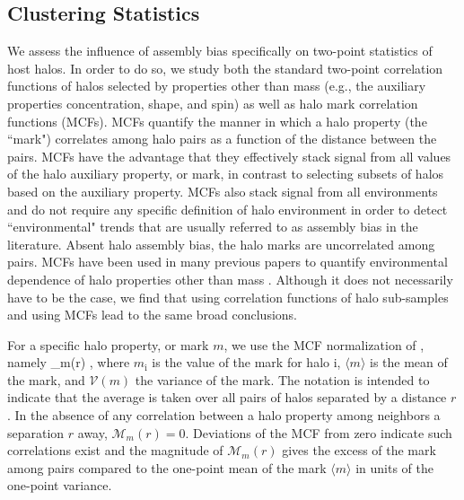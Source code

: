 \documentclass[usenatbib]{mnras}
\begin{document}
\subsection{Clustering Statistics}
\label{subsection:clusteringstatistics}


We assess the influence of assembly bias specifically on two-point statistics of host halos. In order to do so, we 
study both the standard two-point correlation functions of halos selected by properties other than mass 
(e.g., the auxiliary properties concentration, shape, and spin) as well as halo mark correlation functions
(MCFs). MCFs quantify the manner in which a halo property (the ``mark") correlates among halo pairs as a function
of the distance between the pairs. MCFs have the advantage that they effectively stack signal from all values of 
the halo auxiliary property, or mark, in contrast to selecting subsets of halos based on the auxiliary property. 
MCFs also stack signal from all environments and do not require any specific definition of halo environment in 
order to detect ``environmental" trends that are usually referred to as assembly bias in the literature. 
Absent halo assembly bias, the halo marks are uncorrelated among pairs. 
MCFs have been used in many previous papers to quantify environmental dependence of halo 
properties other than mass \citep{sheth_tormen04,sheth05, harker_etal06,wechsler_etal06,mao_etal15}. 
Although it does not necessarily have to be the case, we find that using correlation functions of halo sub-samples 
and using MCFs lead to the same broad conclusions. 


For a specific halo property, or mark $m$, we use the MCF normalization of \citet{wechsler_etal06}, namely 
%
\beq
{}_m(r) \equiv {},
\eeq
%
where $m_{\mathrm{i}}$ is the value of the mark for halo $\mathrm{i}$, $\langle m \rangle$ is the mean of the
mark, and $\mathcal{V}(m)$ the variance of the mark. The notation is intended to indicate that the average is
taken over all pairs of halos separated by a distance $r$. In the absence of any correlation between a halo
property among neighbors a separation $r$ away, $\mathcal{M}_m(r) = 0$. Deviations of the MCF from
zero indicate such correlations exist and the magnitude of $\mathcal{M}_m(r)$ gives the excess of the mark among
pairs compared to the one-point mean of the mark $\langle m\rangle$ in units of the one-point variance. 
\end{document}
